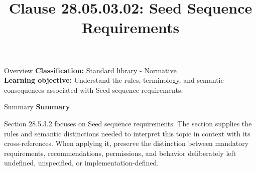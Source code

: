 \documentclass[10pt,letterpaper]{article}
\title{Clause 28.05.03.02: Seed Sequence Requirements}
\author{}
\date{}
\begin{document}
\maketitle
\begin{CornellOverviewBox}{Overview}
\textbf{Classification:} Standard library - Normative\\[2pt]
\textbf{Learning objective:} Understand the rules, terminology, and semantic consequences associated with Seed sequence requirements.
\end{CornellOverviewBox}\begin{CornellSummaryBox}{Summary}
{\sffamily\bfseries\color{Accent} Summary}\par\vspace{3pt}Section 28.5.3.2 focuses on Seed sequence requirements. The section supplies the rules and semantic distinctions needed to interpret this topic in context with its cross-references. When applying it, preserve the distinction between mandatory requirements, recommendations, permissions, and behavior deliberately left undefined, unspecified, or implementation-defined.
\end{CornellSummaryBox}
\end{document}
